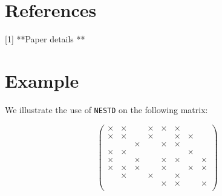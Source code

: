 \section*{References}
[1] **Paper details **




\section{Example}

We illustrate the use of {\tt NESTD} on the following matrix: 

$$
	\left(\begin{array}{cccccccc}
   \times &  \times  &         &  \times  &  \times  & \times &          &           \\
   \times &  \times  &         &  \times  &          & \times &  \times  &           \\ 
          &          & \times  &          &  \times  & \times &          &           \\
   \times &  \times  &         &          &          &        &  \times  &           \\ 
   \times &          & \times  &          &  \times  & \times &          &   \times  \\ 
   \times &  \times  & \times  &          &  \times  &        &  \times  &   \times  \\ 
          &  \times  &         &  \times  &          & \times &          &           \\ 
          &          &         &          &  \times  & \times &          &   \times  \\ 
	\end{array}\right)
$$


\smallskip

